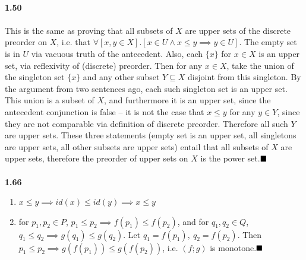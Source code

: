 \documentclass{article}
\begin{document}
 \\
\textbf{1.50}\\
 \\
This is the same as proving that all subsets of $X$ are upper sets of the discrete preorder on $X$, i.e. that $\forall \left[x,y\in X\right].\left[ x\in U \wedge x\leq y \implies y\in U \right]$. The empty set is in $U$ via vacuous truth of the antecedent. Also, each $\{ x\}$ for $x\in X$ is an upper set, via reflexivity of (discrete) preorder. Then for any $x\in X$, take the union of the singleton set $\{ x \}$ and any other subset $Y\subseteq X$ disjoint from this singleton. By the argument from two sentences ago, each such singleton set is an upper set. This union is a subset of $X$, and furthermore it is an upper set, since the antecedent conjunction is false – it is not the case that $x\leq y$ for any $y\in Y$, since they are not comparable via definition of discrete preorder. Therefore all such $Y$ are upper sets. These three statements (empty set is an upper set, all singletons are upper sets, all other subsets are upper sets) entail that all subsets of $X$ are upper sets, therefore the preorder of upper sets on $X$ is the power set.$\hfill\blacksquare$\\
 \\
\textbf{1.66}\bigskip
\begin{enumerate}
	\item $x\leq y\implies id(x)\leq id(y)\implies x\leq y$
	\item for $p_1,p_2\in P$, $p_1\leq p_2 \implies f(p_1)\leq f(p_2)$, and for $q_1,q_2\in Q$, $q_1\leq q_2 \implies g(q_1)\leq g(q_2)$. Let $q_1=f(p_1), \ q_2=f(p_2)$. Then $p_1\leq p_2\implies g(f(p_1))\leq g(f(p_2))$, i.e. $(f;g)$ is monotone.$\hfill\blacksquare$
\end{enumerate}
\end{document}

